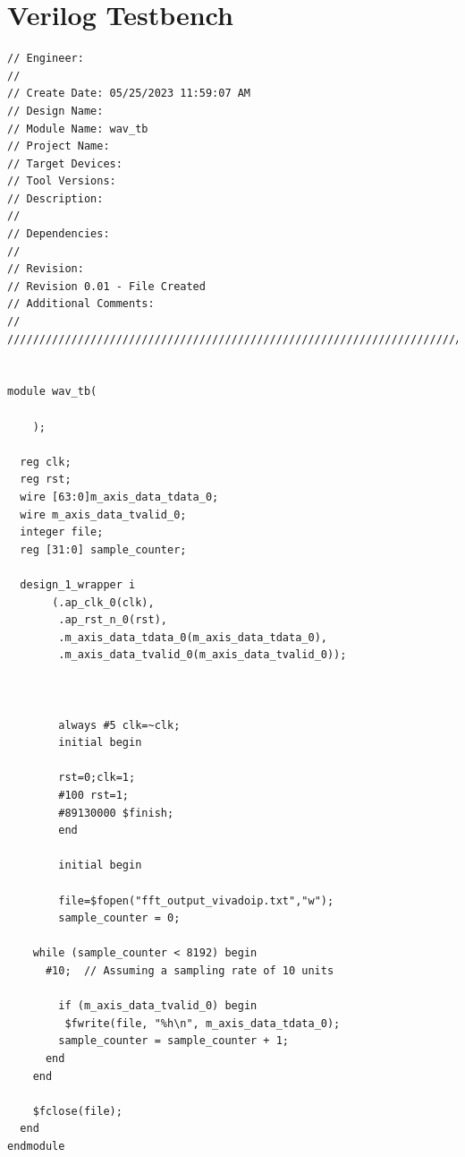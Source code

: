 \documentclass{article}
\begin{document}
\section{Verilog Testbench}
\begin{lstlisting}
// Engineer: 
// 
// Create Date: 05/25/2023 11:59:07 AM
// Design Name: 
// Module Name: wav_tb
// Project Name: 
// Target Devices: 
// Tool Versions: 
// Description: 
// 
// Dependencies: 
// 
// Revision:
// Revision 0.01 - File Created
// Additional Comments:
// 
//////////////////////////////////////////////////////////////////////////////////


module wav_tb(

    );
    
  reg clk; 
  reg rst;
  wire [63:0]m_axis_data_tdata_0;
  wire m_axis_data_tvalid_0;
  integer file;
  reg [31:0] sample_counter;

  design_1_wrapper i
       (.ap_clk_0(clk),
        .ap_rst_n_0(rst),
        .m_axis_data_tdata_0(m_axis_data_tdata_0),
        .m_axis_data_tvalid_0(m_axis_data_tvalid_0));
        

                                       
        always #5 clk=~clk;
        initial begin
        
        rst=0;clk=1;
        #100 rst=1;
        #89130000 $finish;
        end      
        
        initial begin
        
        file=$fopen("fft_output_vivadoip.txt","w");
        sample_counter = 0;

    while (sample_counter < 8192) begin
      #10;  // Assuming a sampling rate of 10 units

        if (m_axis_data_tvalid_0) begin
         $fwrite(file, "%h\n", m_axis_data_tdata_0);
        sample_counter = sample_counter + 1;
      end
    end

    $fclose(file);
  end
endmodule

\end{lstlisting}

\vspace{3cm}
\end{document}
